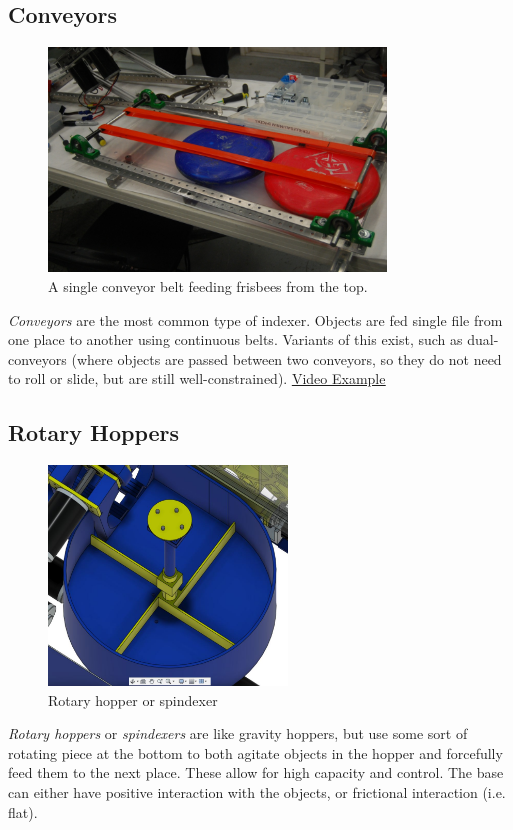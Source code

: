 \documentclass[10pt,letterpaper]{book}
\begin{document}
\subsection{Conveyors}
\begin{figure}[H]
	\includegraphics[width=0.8\textwidth]{imgs/conveyor_single.jpeg}
	\caption{A single conveyor belt feeding frisbees from the top.}
\end{figure}
\textit{Conveyors} are the most common type of indexer. Objects are fed single file from one place to another using continuous belts. Variants of this exist, such as dual-conveyors (where objects are passed between two conveyors, so they do not need to roll or slide, but are still well-constrained).
\href{https://www.youtube.com/watch?v=by2A56mHdRM}{\color{red}\underline{Video Example}}
\subsection{Rotary Hoppers}
\begin{figure}[H]
	\includegraphics[height=2.3in]{imgs/spindexer.jpeg}
	\caption{Rotary hopper or spindexer}
\end{figure}

\textit{Rotary hoppers} or \textit{spindexers} are like gravity hoppers, but use some sort of rotating piece at the bottom to both agitate objects in the hopper and forcefully feed them to the next place. These allow for high capacity and control. The base can either have positive interaction with the objects, or frictional interaction (i.e. flat). 
\end{document}
